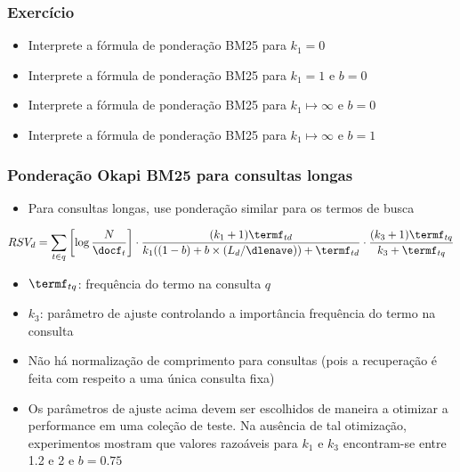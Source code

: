 \documentclass[compress]{beamer}
\def\myblue#1{\textcolor{texblue}{#1}}
\begin{document}
\begin{frame}
\frametitle{Exercício}
\pause[2]

\begin{itemize}
\item Interprete a fórmula de ponderação BM25 para $k_1 =0$ 
\item Interprete a fórmula de ponderação BM25 para $k_1 =1$ e $b=0$
\item Interprete a fórmula de ponderação BM25 para $k_1 \mapsto \infty$ e $b=0$
\item Interprete a fórmula de ponderação BM25 para $k_1 \mapsto \infty$ e $b=1$
\end{itemize}

\end{frame}




\begin{frame}[<+->]
\frametitle{Ponderação Okapi BM25 para consultas longas}
\pause[2]

\begin{itemize}
\item Para consultas longas, use ponderação similar para os termos de busca
\end{itemize}

\begin{equation}
\nonumber
RSV_d = \sum_{t\in q} \left[\log\frac{N}{\docf_t}\right]
\cdot
\frac{(k_1+1)\termf_{td}}{k_1((1-b) + b \times (L_d/\dlenave))+\termf_{td}}
\cdot
\frac{(k_3 + 1)\termf_{tq}}{k_3 + \termf_{tq}} \label{bm25-3}
\end{equation}
\begin{itemize}
\item $\termf_{tq}$: frequência do termo na consulta $q$
\item $k_3$: parâmetro de ajuste controlando a importância frequência do termo na consulta

\item Não há normalização de comprimento para consultas (pois a recuperação é feita com respeito a uma única consulta fixa)

\item Os parâmetros de ajuste acima devem ser escolhidos de maneira a otimizar a performance  em uma coleção de teste. Na ausência de tal otimização, experimentos mostram que valores  razoáveis para $k_1$ e $k_3$ encontram-se entre  1.2 e 2 e $b = 0.75$
\end{itemize}

\end{frame}
\end{document}
